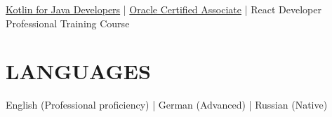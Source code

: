 \documentclass[letterpaper,12pt]{article}
\begin{document}
\href{https://coursera.org/share/e12f35f62b90ef628b7a1da3aff6500e}{Kotlin for Java Developers} | \href{https://www.credly.com/badges/0bcb9354-f5b2-4477-96b1-03b188d196f1?source=linked_in_profile}{Oracle Certified Associate} | React Developer Professional Training Course


\section{LANGUAGES}

\vspace{2pt}

English (Professional proficiency) | German (Advanced) | Russian (Native)
\end{document}
